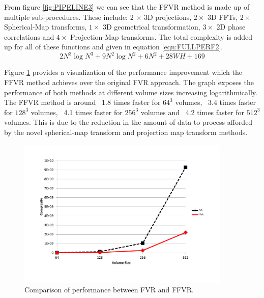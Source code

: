 From figure \ref{fig:PIPELINE3} we can see that the FFVR method is made up of multiple sub-procedures. These include: 2 $\times$ 3D projections, $2 \times$ 3D FFTs, $2 \times$ Spherical-Map transforms, $1 \times$ 3D geometrical transformation, $3 \times$ 2D phase correlations and $4 \times$ Projection-Map transforms. The total complexity is added up for all of these functions and given in equation \ref{eqn:FULLPERF2}. \\

\begin{equation} \label{eqn:FULLPERF2}
2N^3\log{N^3} + 9N^2\log{N^2} + 6N^2 + 28WH + 169
\end{equation}

Figure \ref{fig:perfComp} provides a visualization of the performance improvement which the FFVR method achieves over the original FVR approach. The graph exposes the performance of both methods at different volume sizes increasing logarithmically. The FFVR method is around ~1.8 times faster for $64^3$ volumes, ~3.4 times faster for $128^3$ volumes, ~4.1 times faster for $256^3$ volumes and ~4.2 times faster for $512^3$ volumes. This is due to the reduction in the amount of data to process afforded by the novel spherical-map transform and projection map transform methods.

\begin{figure}[!htb]
\centering
\includegraphics[width=4.0in]{images/methodology/FVR/performanceImprovement}
\caption{Comparison of performance between FVR and FFVR.}
\label{fig:perfComp}
\end{figure}
